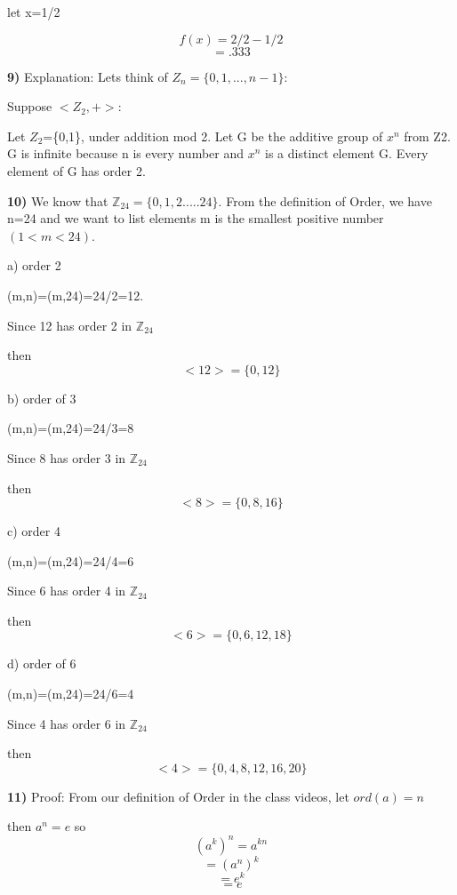 \documentclass{article}
\begin{document}
let x=1/2

$$f(x)=2/2-1/2$$
$$=.333$$



\newpage
\textbf{9)} Explanation: Lets think of $Z_n=\{0, 1, ...,n-1\}$:

\bigskip

Suppose  $<Z_2,+>$:
\medskip
\bigskip


Let $Z_2$=\{0,1\}, under addition mod 2. Let G be the additive group of $x^{n}$ from Z2.
 G is infinite because n is every number and $x^{n}$ is a distinct element G. Every element of G has order 2.
\newpage

\textbf{10)}  We know that $\mathbb{Z}_{24}=\{0,1,2.....24\}$. From the definition of Order, we have n=24 and we want to list elements m is the smallest positive number $(1<m<24)$.

\medskip

a) order 2
\medskip

(m,n)=(m,24)=24/2=12.
\medskip

Since 12 has order 2 in $\mathbb{Z}_{24} $
\medskip

then $$<12>=\{0,12\}$$
\medskip


b) order of 3
\medskip

(m,n)=(m,24)=24/3=8
\medskip

Since 8 has order 3 in $\mathbb{Z}_{24}$
\medskip

then $$<8>=\{0,8,16\}$$

\medskip
c) order 4
\medskip

(m,n)=(m,24)=24/4=6

\medskip

Since 6 has order 4 in $\mathbb{Z}_{24}$
\medskip

then $$<6>=\{0, 6, 12, 18\}$$


\medskip
d) order of 6


(m,n)=(m,24)=24/6=4
\medskip

Since 4 has order 6 in $\mathbb{Z}_{24}$

\medskip
then $$<4>=\{0, 4, 8, 12, 16, 20\}$$



\newpage

\textbf{11)} Proof:  From our definition of Order in the class videos, let $ord(a)=n$

then $a^{n}=e$
so $$(a^{k})^{n}=a^{kn}$$
$$=(a^{n})^{k}$$
$$=e^{k}$$
$$=e$$
\end{document}
